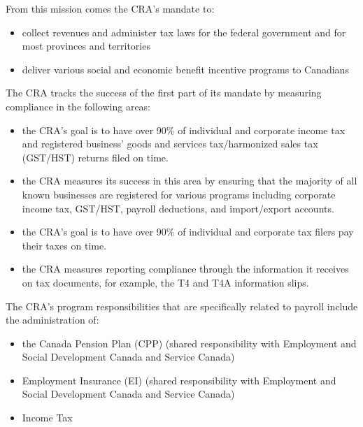 \documentclass[letterpaper,10pt,english]{sphinxmanual}
\begin{document}
\sphinxAtStartPar
From this mission comes the CRA’s mandate to:
\begin{itemize}
\item {} 
\sphinxAtStartPar
collect revenues and administer tax laws for the federal government and for most provinces and territories

\item {} 
\sphinxAtStartPar
deliver various social and economic benefit incentive programs to Canadians

\end{itemize}

\sphinxAtStartPar
The CRA tracks the success of the first part of its mandate by measuring compliance in the following areas:
\begin{itemize}
\item {} 
\sphinxAtStartPar
{} the CRA’s goal is to have over 90\% of individual and corporate income tax and registered business’ goods and services tax/harmonized sales tax (GST/HST) returns filed on time.

\item {} 
\sphinxAtStartPar
{} the CRA measures its success in this area by ensuring that the majority of all known businesses are registered for various programs including corporate income tax, GST/HST, payroll deductions, and import/export accounts.

\item {} 
\sphinxAtStartPar
{} the CRA’s goal is to have over 90\% of individual and corporate tax filers pay their taxes on time.

\item {} 
\sphinxAtStartPar
{} the CRA measures reporting compliance through the information it receives on tax documents, for example, the T4 and T4A information slips.

\end{itemize}

\sphinxAtStartPar
The CRA’s program responsibilities that are specifically related to payroll include the administration of:
\begin{itemize}
\item {} 
\sphinxAtStartPar
the Canada Pension Plan (CPP) (shared responsibility with Employment and Social Development Canada and Service Canada)

\item {} 
\sphinxAtStartPar
Employment Insurance (EI) (shared responsibility with Employment and Social Development Canada and Service Canada)

\item {} 
\sphinxAtStartPar
Income Tax

\end{itemize}
\end{document}
